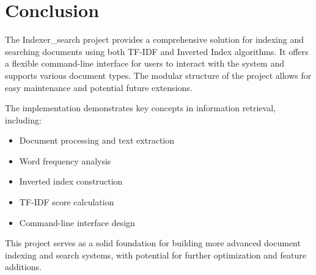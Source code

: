 \documentclass{article}
\begin{document}
\section{Conclusion}
The Indexer\_search project provides a comprehensive solution for indexing and searching documents using both TF-IDF and Inverted Index algorithms. It offers a flexible command-line interface for users to interact with the system and supports various document types. The modular structure of the project allows for easy maintenance and potential future extensions.

The implementation demonstrates key concepts in information retrieval, including:
\begin{itemize}
    \item Document processing and text extraction
    \item Word frequency analysis
    \item Inverted index construction
    \item TF-IDF score calculation
    \item Command-line interface design
\end{itemize}

This project serves as a solid foundation for building more advanced document indexing and search systems, with potential for further optimization and feature additions.

\sloppy
\fussy
\end{document}
